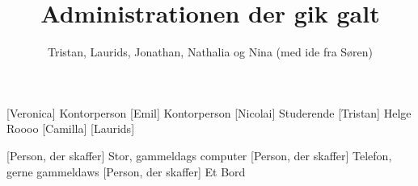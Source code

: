 \documentclass[a4paper,11pt]{article}
\title{Administrationen der gik galt}
\author{Tristan, Laurids, Jonathan, Nathalia og Nina (med ide fra Søren)}
\begin{document}
\maketitle

\begin{roles}
    [Veronica] Kontorperson
    [Emil] Kontorperson
    [Nicolai] Studerende
    [Tristan] Helge Roooo
    [Camilla]
    [Laurids] 
\end{roles}

\begin{props}
    [Person, der skaffer] Stor, gammeldags computer
    [Person, der skaffer] Telefon, gerne gammeldaws
    [Person, der skaffer] Et Bord
\end{props}
\end{document}
